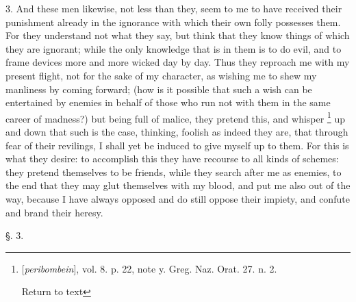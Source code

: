 3. And these men likewise, not less than they,
seem to me to have received their punishment already in the ignorance
with which their own folly possesses them. For they understand not
what they say, but think that they know things of which they are
ignorant; while the only knowledge that is in them is to do evil, and
to frame devices more and more wicked day by day. Thus they reproach
me with my present flight, not for the sake of my character, as
wishing me to shew my manliness by coming forward; (how is it possible
that such a wish can be entertained by enemies in behalf of those who
run not with them in the same career of madness?) but being full of
malice, they pretend this, and whisper \footnote{[\emph{peribombein}], vol. 8. p. 22, note y. Greg. Naz. Orat. 27. n.
2.

Return to text} up and down that such is the case, thinking, foolish as indeed
they are, that through fear of their revilings, I shall yet be induced
to give myself up to them. For this is what they desire: to accomplish
this they have recourse to all kinds of schemes: they pretend
themselves to be friends, while they search after me as enemies,
to the end that they may glut themselves with my blood, and put me
also out of the way, because I have always opposed and do still oppose
their impiety, and confute and brand their heresy.

§. 3.

